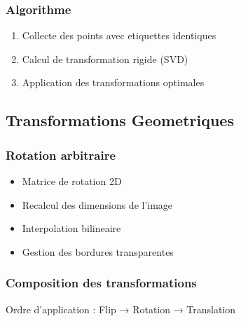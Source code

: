 \documentclass[12pt,a4paper]{article}
\begin{document}
\subsubsection{Algorithme}
\begin{enumerate}
\item Collecte des points avec etiquettes identiques
\item Calcul de transformation rigide (SVD)
\item Application des transformations optimales
\end{enumerate}

\subsection{Transformations Geometriques}

\subsubsection{Rotation arbitraire}
\begin{itemize}
\item Matrice de rotation 2D
\item Recalcul des dimensions de l'image
\item Interpolation bilineaire
\item Gestion des bordures transparentes
\end{itemize}

\subsubsection{Composition des transformations}
Ordre d'application : Flip → Rotation → Translation
\end{document}
